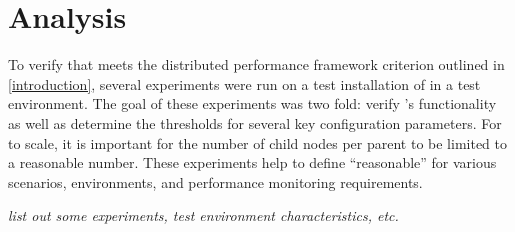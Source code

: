 \chapter{Analysis}
\label{Analysis}

To verify that \dcamp meets the distributed performance framework criterion outlined in \ref{introduction}, several experiments were run on a test installation of \dcamp in a test environment. The goal of these experiments was two fold: verify \dcamp's functionality as well as determine the thresholds for several key configuration parameters. For \dcamp to scale, it is important for the number of child nodes per parent to be limited to a reasonable number. These experiments help to define ``reasonable'' for various scenarios, environments, and performance monitoring requirements.

\emph{list out some experiments, test environment characteristics, etc.}

